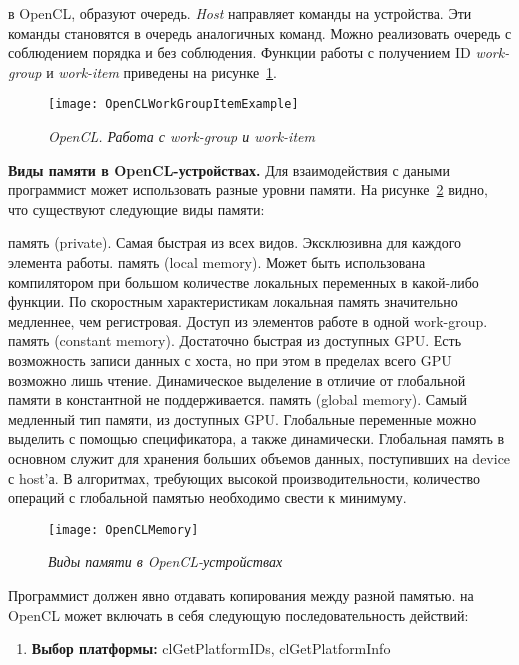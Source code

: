 {	 в OpenCL, образуют очередь. \textit{Host} направляет команды на устройства. Эти команды становятся в очередь аналогичных команд. Можно реализовать очередь с соблюдением порядка и без соблюдения.
	Функции работы с получением ID \textit{work-group} и \textit{work-item} приведены на рисунке~\ref{OpenCLWorkGroupItemExample:image}.
	\begin{figure}[H]
		\texttt{[image: OpenCLWorkGroupItemExample]}
		\caption{\textit{OpenCL. Работа с work-group и work-item}}
		\label{OpenCLWorkGroupItemExample:image}
	\end{figure}
	\par\textbf{Виды памяти в OpenCL-устройствах.} Для взаимодействия с даными программист может использовать разные уровни памяти. На рисунке~\ref{OpenCLMemory:image} видно, что существуют следующие виды памяти:
	\begin{itemize}
		 память (private). Самая быстрая из всех видов. Эксклюзивна для каждого элемента работы.
		 память (local memory). Может быть использована компилятором при большом количестве локальных переменных в какой-либо функции. По скоростным характеристикам локальная память значительно медленнее, чем регистровая. Доступ из элементов работе в одной work-group.
		 память (constant memory). Достаточно быстрая из доступных GPU. Есть возможность записи данных с хоста, но при этом в пределах всего GPU возможно лишь чтение. Динамическое выделение в отличие от глобальной памяти в константной не поддерживается.
		 память (global memory). Самый медленный тип памяти, из доступных GPU. Глобальные переменные можно выделить с помощью спецификатора, а также динамически. Глобальная память в основном служит для хранения больших объемов данных, поступивших на device с host’а. В алгоритмах, требующих высокой производительности, количество операций с глобальной памятью необходимо свести к минимуму.
	\end{itemize}	
	\begin{figure}[H]
		\texttt{[image: OpenCLMemory]}
		\caption{\textit{Виды памяти в OpenCL-устройствах}}
		\label{OpenCLMemory:image}
	\end{figure}
	Программист должен явно отдавать копирования между разной памятью.
	 на OpenCL может включать в себя следующую последовательность действий:
		\begin{enumerate}
			\item\textbf{Выбор платформы:} clGetPlatformIDs, clGetPlatformInfo

\end{enumerate}}

